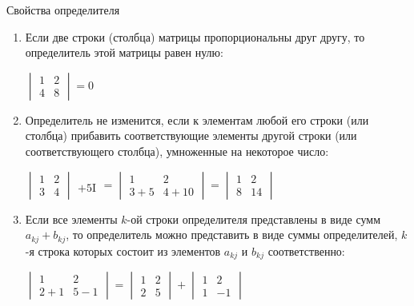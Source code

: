 \documentclass[unicode,11pt,notheorems]{beamer}
\begin{document}
\begin{frame}[allowframebreaks]{Свойства определителя}{}
\begin{enumerate}
	    \hfill
		\alert{$
		\begin{vmatrix}
			1 & 2\\
			1 & 2
		\end{vmatrix} 
		= 0
		$}


	\item 
		Если две строки (столбца) матрицы \alert{пропорциональны друг другу}, то определитель этой матрицы равен нулю:

	    \hfill
		\alert{$
		\begin{vmatrix}
			1 & 2\\
			4 & 8
		\end{vmatrix} 
		= 0
		$}

	\item 
	    Определитель не изменится, если к элементам любой его строки (или столбца) прибавить соответствующие элементы другой строки (или соответствующего столбца), умноженные на некоторое число:
	    
	    \hfill
		\alert{$
		\begin{vmatrix}
			1 & 2\\
			3 & 4
		\end{vmatrix} 
		\begin{matrix}
			\\
			+5\text{I}
		\end{matrix} 
		= 
		\begin{vmatrix}
			1 & 2\\
			3+5 & 4+10
		\end{vmatrix} 
		= 
		\begin{vmatrix}
			1 & 2\\
			8 & 14
		\end{vmatrix} 
		$}
		
	\item 
		 Если все элементы $k$-ой строки определителя представлены в виде сумм  $a_{kj} + b_{kj}$, то определитель можно представить в виде суммы определителей, 
		$k$-я строка которых состоит из элементов $a_{kj}$ и $b_{kj}$ соответственно:
		
	    \hfill
		\alert{$
		\begin{vmatrix}
			1 & 2\\
			2+1 & 5-1
		\end{vmatrix}
		= 
		\begin{vmatrix}
			1 & 2\\
			2 & 5
		\end{vmatrix}
		+
		\begin{vmatrix}
			1 & 2\\
			1 & -1
		\end{vmatrix}
		$}


\end{enumerate}
\end{frame}
\end{document}
